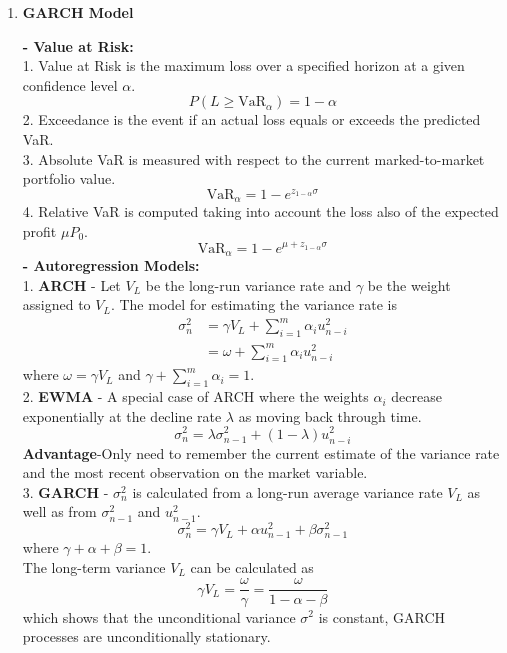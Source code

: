 \documentclass{article}
\begin{document}
\begin{enumerate}[S1 - ]
    \item \textbf{GARCH Model}\\\par
    \textbf{- Value at Risk:}\\
    1. Value at Risk is the maximum loss over a specified horizon at a given confidence level $\alpha$.
    \begin{equation*}
    P(L \geq \text{VaR}_{\alpha}) = 1-\alpha
    \end{equation*}
    2. Exceedance is the event if an actual loss equals or exceeds the predicted VaR.\\
    3. Absolute VaR is measured with respect to the current marked-to-market portfolio value.
    \begin{equation*}
    \text{VaR}_{\alpha} = 1 - e^{z_{1-\alpha}\sigma}
    \end{equation*}
    4. Relative VaR is computed taking into account the loss also of the expected profit $\mu P_0$.
    \begin{equation*}
    \text{VaR}_{\alpha} = 1 - e^{\mu+z_{1-\alpha}\sigma}
    \end{equation*}
    \textbf{- Autoregression Models:}\\
    1. \textbf{ARCH} - Let $V_L$ be the long-run variance rate and $\gamma$ be the weight assigned
    to $V_L$. The model for estimating the variance rate is
    \begin{equation*}
    \begin{split}
    \sigma_n^2 & = \gamma V_L + \sum_{i=1}^m \alpha_i u_{n-i}^2\\
    & = \omega + \sum_{i=1}^m \alpha_i u_{n-i}^2
    \end{split}
    \end{equation*}
    where $\omega = \gamma V_L$ and $\gamma + \sum_{i=1}^{m} \alpha_i = 1$.\\
    2. \textbf{EWMA} - A special case of ARCH where the weights $\alpha_i$ decrease exponentially at the decline rate $\lambda$ as moving back through time.
    \begin{equation*}
    \sigma_n^2  = \lambda \sigma_{n-1}^2 + (1-\lambda) u_{n-i}^2
    \end{equation*}
    \textbf{Advantage}-Only need to remember the current estimate of the variance rate and the most recent observation on the market variable.\\
    3. \textbf{GARCH} - $\sigma_n^2$ is calculated from a long-run average variance rate $V_L$ as well as from $\sigma_{n-1}^2$ and $u_{n-1}^2$.\\
    \begin{equation*}
    \sigma_n^2  = \gamma V_L + \alpha u_{n-1}^2 + \beta\sigma_{n-1}^2
    \end{equation*}
    where $\gamma + \alpha + \beta = 1$.\\
    The long-term variance $V_L$ can be calculated as
    \begin{equation*}
    \gamma V_L = \frac{\omega}{\gamma} = \frac{\omega}{1-\alpha-\beta}
    \end{equation*}
    which shows that the unconditional variance $\sigma^2$ is constant, GARCH processes are unconditionally stationary.
\end{enumerate}
\end{document}
